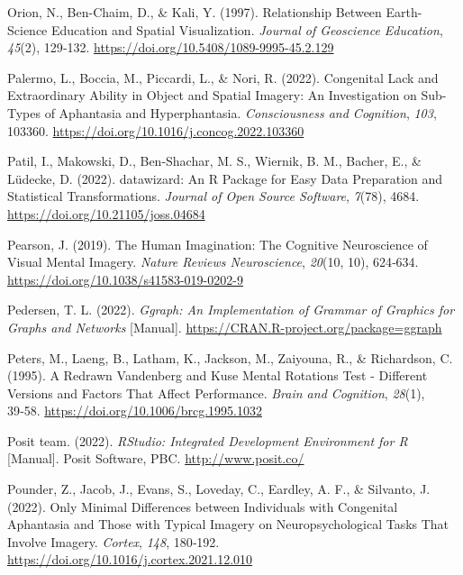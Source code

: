 \documentclass[
  12pt,
]{article}
\newlength{\cslhangindent}
\newlength{\cslentryspacingunit} %
\newenvironment{CSLReferences}[2] %
 {%
  \setlength{\parindent}{0pt}
  \ifodd #1
  \let\oldpar\par
  \def\par{\hangindent=\cslhangindent\oldpar}
  \fi
  \setlength{\parskip}{#2\cslentryspacingunit}
 }%
 {}
\begin{document}
\begin{CSLReferences}{1}{0}
\leavevmode{}%
Orion, N., Ben-Chaim, D., \& Kali, Y. (1997). Relationship {Between
Earth-Science Education} and {Spatial Visualization}. \emph{Journal of
Geoscience Education}, \emph{45}(2), 129‑132.
\url{https://doi.org/10.5408/1089-9995-45.2.129}

\leavevmode{}%
Palermo, L., Boccia, M., Piccardi, L., \& Nori, R. (2022). Congenital
Lack and Extraordinary Ability in Object and Spatial Imagery: {An}
Investigation on Sub-Types of Aphantasia and Hyperphantasia.
\emph{Consciousness and Cognition}, \emph{103}, 103360.
\url{https://doi.org/10.1016/j.concog.2022.103360}

\leavevmode{}%
Patil, I., Makowski, D., Ben-Shachar, M. S., Wiernik, B. M., Bacher, E.,
\& Lüdecke, D. (2022). {datawizard}: {An R} Package for Easy Data
Preparation and Statistical Transformations. \emph{Journal of Open
Source Software}, \emph{7}(78), 4684.
\url{https://doi.org/10.21105/joss.04684}

\leavevmode{}%
Pearson, J. (2019). The Human Imagination: The Cognitive Neuroscience of
Visual Mental Imagery. \emph{Nature Reviews Neuroscience}, \emph{20}(10,
10), 624‑634. \url{https://doi.org/10.1038/s41583-019-0202-9}

\leavevmode{}%
Pedersen, T. L. (2022). \emph{Ggraph: {An} Implementation of Grammar of
Graphics for Graphs and Networks} {[}Manual{]}.
\url{https://CRAN.R-project.org/package=ggraph}

\leavevmode{}%
Peters, M., Laeng, B., Latham, K., Jackson, M., Zaiyouna, R., \&
Richardson, C. (1995). A {Redrawn Vandenberg} and {Kuse Mental Rotations
Test} - {Different Versions} and {Factors That Affect Performance}.
\emph{Brain and Cognition}, \emph{28}(1), 39‑58.
\url{https://doi.org/10.1006/brcg.1995.1032}

\leavevmode{}%
Posit team. (2022). \emph{{RStudio}: {Integrated} Development
Environment for {R}} {[}Manual{]}. {Posit Software, PBC}.
\url{http://www.posit.co/}

\leavevmode{}%
Pounder, Z., Jacob, J., Evans, S., Loveday, C., Eardley, A. F., \&
Silvanto, J. (2022). Only Minimal Differences between Individuals with
Congenital Aphantasia and Those with Typical Imagery on
Neuropsychological Tasks That Involve Imagery. \emph{Cortex},
\emph{148}, 180‑192. \url{https://doi.org/10.1016/j.cortex.2021.12.010}


\end{CSLReferences}
\end{document}
